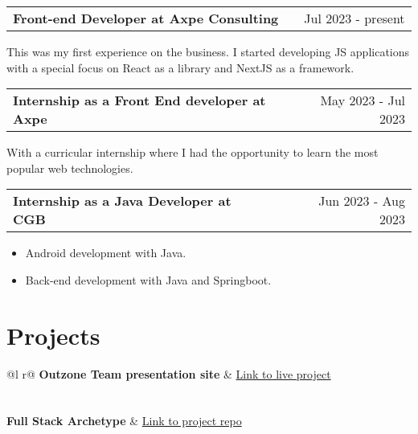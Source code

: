 \documentclass[a4paper,12pt]{article}
\makeatletter
\newenvironment{jobshort}[2]
    {
    \begin{tabularx}{\linewidth}{@{}l X r@{}}
    \textbf{#1} & \hfill &  #2 \\[3.75pt]
    \end{tabularx}
    }
    {
    }
\newenvironment{joblong}[2]
    {
    \begin{tabularx}{\linewidth}{@{}l X r@{}}
    \textbf{#1} & \hfill &  #2 \\[3.75pt]
    \end{tabularx}
    \begin{minipage}[t]{\linewidth}
    \begin{itemize}[nosep,after=\strut, leftmargin=1em, itemsep=3pt,label=--]
    }
    {
    \end{itemize}
    \end{minipage}
    }
\makeatother
\begin{document}
\begin{jobshort}{Front-end Developer at Axpe Consulting}{Jul 2023 - present}
This was my first experience on the business. I started developing JS applications with a special focus on React as a library and NextJS as a framework.
\end{jobshort}


\begin{jobshort}{Internship as a Front End developer at Axpe}{May 2023 - Jul 2023}
With a curricular internship where I had the opportunity to learn the most popular web technologies.
\end{jobshort}

\begin{joblong}{Internship as a Java Developer at CGB}{Jun 2023 - Aug 2023}
\item Android development with Java.
\item Back-end development with Java and Springboot.
\end{joblong}

\section{Projects}

\begin{tabularx}{\linewidth}{ @{}l r@{} }
\textbf{Outzone Team presentation site} & \hfill \href{https://outzone.es}{Link to live project} \\[3.75pt]
  \\
\\
\textbf{Full Stack Archetype} & \hfill \href{https://github.com/dqnid/full-stack-archetype}{Link to project repo} \\[3.75pt]
  \\

\end{tabularx}

\end{document}
